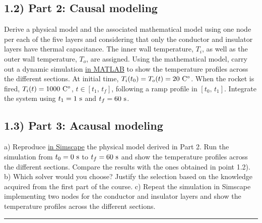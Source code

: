 \documentclass[11pt,a4paper,oneside]{article}
\begin{document}
\subsection*{1.2) Part 2: Causal modeling}
Derive a physical model and the associated mathematical model using one node per each of the five layers and considering that only the conductor and insulator layers have thermal capacitance. The inner wall temperature, $T_i$, as well as the outer wall temperature, $T_o$, are assigned.
Using the mathematical model, carry out a dynamic simulation \underline{in MATLAB} to show the temperature profiles across the different sections. At initial time, $T_i(t_0)=T_o(t) = 20\ {\rm C^\circ}$. When the rocket is fired, $T_i(t) = 1000\ {\rm C^\circ}$, $t\in[t_1,\,t_f]$, following a ramp profile in $[t_0,\,t_1]$. Integrate the system using $t_1 = 1\ {\rm s}$ and $t_f = 60\ {\rm s}$.

\subsection*{1.3) Part 3: Acausal modeling}
a) Reproduce \underline{in Simscape} the physical model derived in Part 2. Run the simulation from $t_0 = 0\ {\rm s}$ to $t_f = 60\ {\rm s}$ and show the temperature profiles across the different sections. Compare the results with the ones obtained in point 1.2). 
b) Which solver would you choose? Justify the selection based on the knowledge acquired from the first part of the course.
c) Repeat the simulation in Simscape implementing two nodes for the conductor and insulator layers and show the temperature profiles across the different sections.
\medskip

\medskip \hrule \medskip
{}
\end{document}
